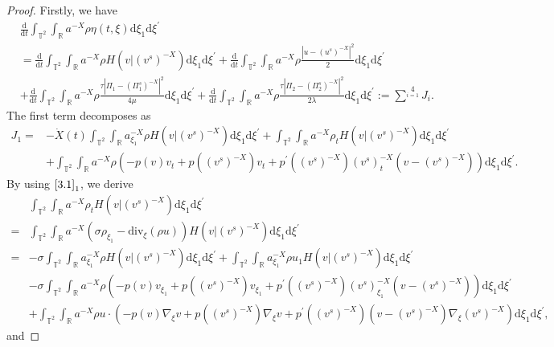 \documentclass[10pt,reqno]{amsart}
\numberwithin{equation}{section}
\newcommand{\dif}{\mathrm{d}}
\newcommand{\ddiv}{\mathrm{div}}
\begin{document}
\begin{proof}
Firstly, we have
\begin{align*}
&\frac{\dif}{\dif t}\int_{\mathbb{T}^2}\int_{\mathbb{R}}a^{-X}\rho\eta(t,\xi)\dif \xi_1\dif \xi^{\prime}\\
&=
\frac{\dif}{\dif t}\int_{\mathbb{T}^2}\int_{\mathbb{R}}a^{-X}\rho H(v|(v^s)^{-X})\dif \xi_1\dif \xi^{\prime}
+\frac{\dif}{\dif t}\int_{\mathbb{T}^2}\int_{\mathbb{R}}a^{-X}\rho\frac{|u-(u^s)^{-X}|^2}{2}
\dif \xi_1\dif \xi^{\prime}\\
&+\frac{\dif}{\dif t}\int_{\mathbb{T}^2}\int_{\mathbb{R}}a^{-X}\rho\frac{\tau|\Pi_1-(\Pi_1^s)^{-X}|^2}{4\mu}\dif \xi_1\dif \xi^{\prime}
+\frac{\dif}{\dif t}\int_{\mathbb{T}^2}\int_{\mathbb{R}}a^{-X}\rho\frac{\tau|\Pi_2-(\Pi_2^s)^{-X}|^2}{2\lambda}\dif \xi_1\dif \xi^{\prime}:=\sum\limits^4\limits_{i=1}J_i.
\end{align*}
The first term decomposes as
\begin{align*}
J_1
=&-\dot{X}(t)\int_{\mathbb{T}^2}\int_{\mathbb{R}}a^{-X}_{\xi_1}\rho H(v|(v^s)^{-X})\dif \xi_1\dif \xi^{\prime}
+\int_{\mathbb{T}^2}\int_{\mathbb{R}}a^{-X}\rho_t H(v|(v^s)^{-X})\dif \xi_1\dif \xi^{\prime}\\
&+\int_{\mathbb{T}^2}\int_{\mathbb{R}}a^{-X}\rho
\left(-p(v)v_t+p((v^s)^{-X})v_t+p^{\prime}((v^s)^{-X})(v^s)^{-X}_t(v-(v^s)^{-X})\right)\dif \xi_1\dif \xi^{\prime}.
\end{align*}
By using $\eqref{3.1}_1$, we derive
\begin{align*}
&\int_{\mathbb{T}^2}\int_{\mathbb{R}}a^{-X}\rho_t H(v|(v^s)^{-X})\dif \xi_1\dif \xi^{\prime}\\
=&\int_{\mathbb{T}^2}\int_{\mathbb{R}}a^{-X}\left(\sigma\rho_{\xi_1}-\ddiv_\xi(\rho u)\right) H(v|(v^s)^{-X})\dif \xi_1\dif \xi^{\prime}\\
=&-\sigma\int_{\mathbb{T}^2}\int_{\mathbb{R}}a^{-X}_{\xi_1}\rho H(v|(v^s)^{-X})\dif \xi_1\dif \xi^{\prime}
+\int_{\mathbb{T}^2}\int_{\mathbb{R}}a^{-X}_{\xi_1}\rho u_1 H(v|(v^s)^{-X})\dif \xi_1\dif \xi^{\prime}\\
&-\sigma\int_{\mathbb{T}^2}\int_{\mathbb{R}}a^{-X}\rho
\left(-p(v)v_{\xi_1}+p((v^s)^{-X})v_{\xi_1}+p^{\prime}((v^s)^{-X})(v^s)^{-X}_{\xi_1}(v-(v^s)^{-X})\right)\dif \xi_1\dif \xi^{\prime}\\
&+\int_{\mathbb{T}^2}\int_{\mathbb{R}}a^{-X}\rho u\cdot
\left(-p(v)\nabla_\xi v+p((v^s)^{-X})\nabla_\xi v+p^{\prime}((v^s)^{-X})(v-(v^s)^{-X})\nabla_\xi (v^s)^{-X}\right)\dif \xi_1\dif \xi^{\prime},
\end{align*}
and

\end{proof}
\end{document}
